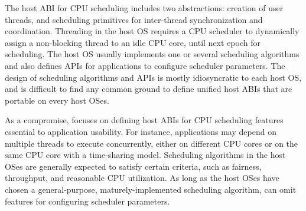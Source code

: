 \label{sec:abi:thread}

The host ABI for CPU scheduling includes two abstractions:
creation of user threads, and scheduling primitives
for inter-thread synchronization and coordination.
Threading in the host OS requires a CPU scheduler
to dynamically assign a non-blocking thread to an idle CPU core, until next epoch for scheduling.
The host OS usually implements one or several scheduling algorithms and also defines APIs for applications
to configure scheduler parameters.
The design of scheduling algorithms and
APIs is mostly idiosyncratic to each host OS,
and is difficult to find any common ground to define unified host ABIs that are portable on every host OSes.



As a compromise, \graphene{} focuses on defining host ABIs for CPU scheduling features
essential to application usability.
For instance, applications may depend on multiple threads to execute concurrently, either on different CPU cores or on the same CPU core with a time-sharing model.
Scheduling algorithms in the host OSes are generally expected to satisfy certain criteria, such as fairness, throughput, and reasonable CPU utilization.
As long as the host OSes have chosen
a general-purpose, maturely-implemented scheduling algorithm,
\thehostabi{} can omit features
for configuring scheduler parameters. 











